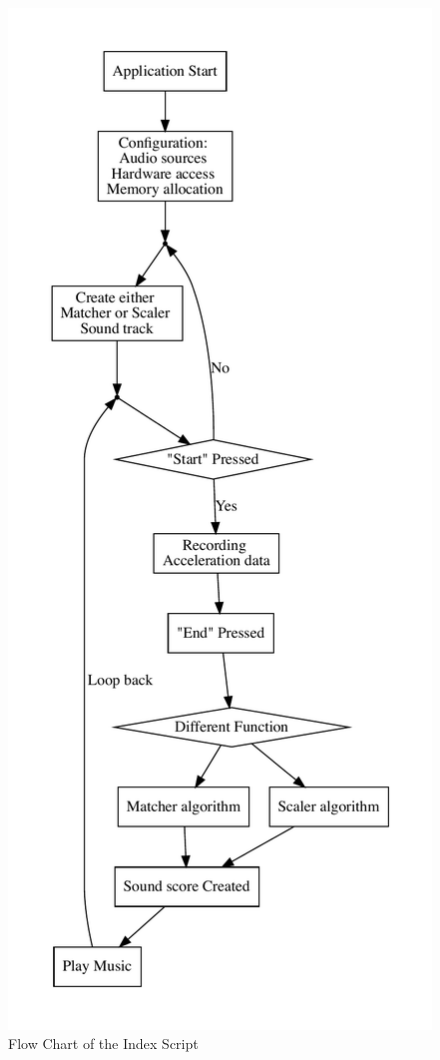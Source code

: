 \begin{figure}[H]
\centering
\includegraphics[height=1\textheight]{figWR/a}
\caption{Flow Chart of the Index Script}
\label{indexScript}
\end{figure}

